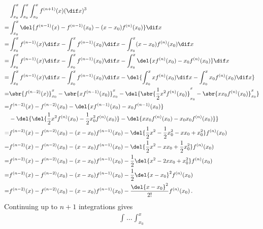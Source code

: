 \begin{align*}
  &\int_{x_0}^x\int_{x_0}^x\int_{x_0}^x{f^{(n+1)}(x)} (\dif x)^3 \\
  = &\int_{x_0}^x{\del{ f^{(n-1)}(x) - f^{(n-1)}(x_0) - (x - x_0) f^{(n)}(x_0) }}\dif x \\
  = &\int_{x_0}^x{f^{(n-1)}(x)}\dif x - \int_{x_0}^x{f^{(n-1)}(x_0)}\dif x - \int_{x_0}^x(x - x_0){f^{(n)}(x_0)}\dif x \\
  = &\int_{x_0}^x{f^{(n-1)}(x)}\dif x - \int_{x_0}^x{f^{(n-1)}(x_0)}\dif x - \int_{x_0}^x\del{x f^{(n)}(x_0) - x_0 f^{(n)}(x_0)}\dif x \\
  = &\int_{x_0}^x{f^{(n-1)}(x)}\dif x - \int_{x_0}^x{f^{(n-1)}(x_0)}\dif x - \del{ \int_{x_0}^x{x f^{(n)}(x_0)}\dif x - \int_{x_0}^x{x_0 f^{(n)}(x_0)}\dif x } \\
  = &\sbr{ f^{(n-2)}(x) }_{x_0}^x -\sbr{ x f^{(n-1)}(x_0) }_{x_0}^x - \del{ \sbr{ \frac{1}{2}x^2f^{(n)}(x_0) }_{x_0}^x - \sbr{ xx_0f^{(n)}(x_0) }_{x_0}^x } \\
  = &f^{(n-2)}(x)
    - f^{(n-2)}(x_0)
    - \del{ x f^{(n-1)}(x_0)
    - x_0 f^{(n-1)}(x_0) } \\
  &- \del{ \del{ \frac{1}{2} x^2 f^{(n)}(x_0)
    - \frac{1}{2} x_0^2 f^{(n)}(x_0) }
    - \del{ x x_0 f^{(n)}(x_0)
    - x_0 x_0 f^{(n)}(x_0) } } \\
  = &f^{(n-2)}(x)
    - f^{(n-2)}(x_0)
    - (x - x_0) f^{(n-1)}(x_0) - \del{ \frac{1}{2} x^2 - \frac{1}{2} x_0^2 - x x_0 + x_0^2 } f^{(n)}(x_0) \\
  = &f^{(n-2)}(x)
    - f^{(n-2)}(x_0)
    - (x - x_0) f^{(n-1)}(x_0) - \del{ \frac{1}{2} x^2 - x x_0 + \frac{1}{2} x_0^2 } f^{(n)}(x_0) \\
  = &f^{(n-2)}(x)
    - f^{(n-2)}(x_0)
    - (x - x_0) f^{(n-1)}(x_0) - \frac{1}{2} \del{ x^2 - 2 x x_0 + x_0^2 } f^{(n)}(x_0) \\
  = &f^{(n-2)}(x)
    - f^{(n-2)}(x_0)
    - (x - x_0) f^{(n-1)}(x_0) - \frac{1}{2} \del{ x - x_0 }^2 f^{(n)}(x_0) \\
  = &f^{(n-2)}(x)
    - f^{(n-2)}(x_0)
    - (x - x_0) f^{(n-1)}(x_0) - \frac{\del{ x - x_0 }^2}{2 !}  f^{(n)}(x_0) \, .
\end{align*}
Continuing up to $n + 1$ integrations gives
\begin{align*}
  \int_{}\hdots_{} \int_{x_0}^x \\
\end{align*}


